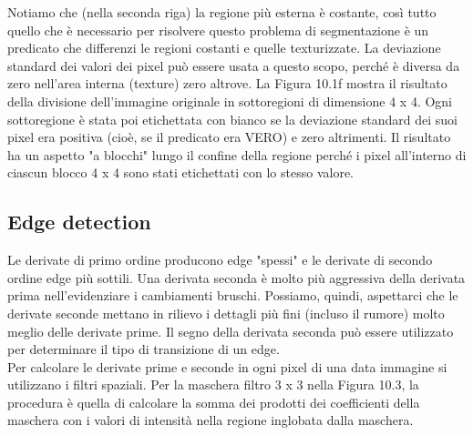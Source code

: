 \documentclass[12pt]{article}
\begin{document}
\FloatBarrier
Notiamo che (nella seconda riga) la regione più esterna è costante, così tutto quello che è necessario per risolvere questo problema di segmentazione è un predicato che differenzi le regioni costanti e quelle texturizzate. La deviazione standard dei valori dei pixel può essere usata a questo scopo, perché è diversa da zero nell'area interna (texture) zero altrove. La Figura 10.1f mostra il risultato della divisione dell'immagine originale in sottoregioni di dimensione 4 x 4. Ogni sottoregione è stata poi etichettata con bianco se la deviazione standard dei suoi pixel era positiva (cioè, se il predicato era
VERO) e zero altrimenti. Il risultato ha un aspetto "a blocchi" lungo il confine della regione perché i pixel all'interno di ciascun blocco 4 x 4 sono stati etichettati con lo stesso valore.
\newpage
\subsection{Edge detection}
Le derivate di primo ordine producono edge "spessi" e le derivate di secondo ordine edge più sottili. Una derivata seconda è molto più aggressiva della derivata prima nell'evidenziare i cambiamenti bruschi. Possiamo, quindi, aspettarci che le derivate seconde mettano in rilievo i dettagli più fini (incluso il rumore) molto meglio delle derivate prime. Il segno della derivata seconda può essere utilizzato per determinare il tipo di transizione di un edge. \\
Per calcolare le derivate prime e seconde in ogni pixel di una data immagine si utilizzano i filtri spaziali. Per la maschera filtro 3 x 3 nella Figura 10.3, la procedura è quella di calcolare la somma dei prodotti dei coefficienti della maschera con i valori di intensità nella regione inglobata dalla maschera.
\end{document}
